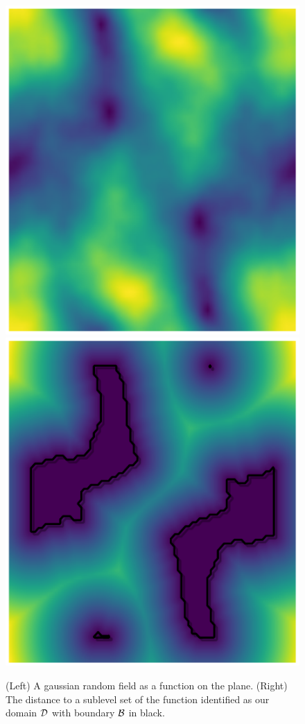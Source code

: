 \begin{figure}[htbp]
\centering
    \includegraphics[scale=0.8]{figures/hsn_domain_0.pdf}\hspace{0.5in}
    \includegraphics[scale=0.8]{figures/hsn_domain_1.pdf}
    \caption{(Left) A gaussian random field as a function on the plane.
            (Right) The distance to a sublevel set of the function identified as our domain ${\mathcal{D}}$ with boundary ${\mathcal{B}}$ in black.}
    \label{fig:hsn}
\end{figure}

